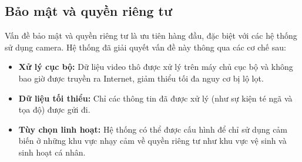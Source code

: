 \subsection{Bảo mật và quyền riêng tư}
Vấn đề bảo mật và quyền riêng tư là ưu tiên hàng đầu, đặc biệt với các hệ thống sử dụng camera. Hệ thống đã giải quyết vấn đề này thông qua các cơ chế sau:
\begin{itemize}
    \item \textbf{Xử lý cục bộ:} Dữ liệu video thô được xử lý trên máy chủ cục bộ và không bao giờ được truyền ra Internet, giảm thiểu tối đa nguy cơ bị lộ lọt.
    \item \textbf{Dữ liệu tối thiểu:} Chỉ các thông tin đã được xử lý (như sự kiện té ngã và tọa độ) được gửi đi.
    \item \textbf{Tùy chọn linh hoạt:} Hệ thống có thể được cấu hình để chỉ sử dụng cảm biến ở những khu vực nhạy cảm về quyền riêng tư như khu vực vệ sinh và sinh hoạt cá nhân.
\end{itemize}
